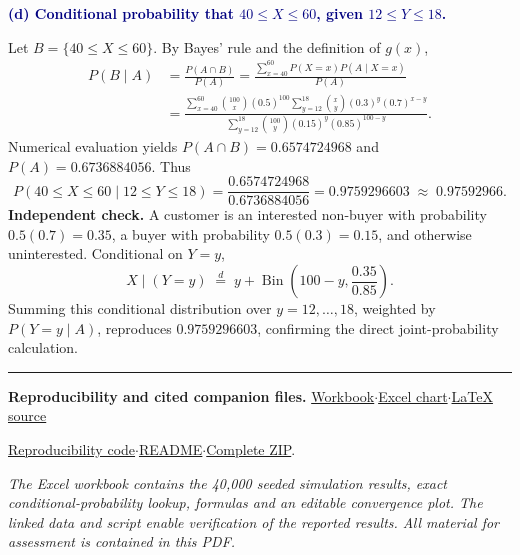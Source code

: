 \documentclass[10pt,a4paper]{article}
\newcommand{\parthead}[1]{\vspace{2pt}\noindent\textcolor{navy}{\bfseries #1}\par\vspace{-2pt}}
\begin{document}
\parthead{(d) Conditional probability that \(40\le X\le60\), given \(12\le Y\le18\).}
Let \(B=\{40\le X\le60\}\). By Bayes' rule and the definition of \(g(x)\),
\begin{align*}
 P(B\mid A)
 &=\frac{P(A\cap B)}{P(A)}
 =\frac{\displaystyle\sum_{x=40}^{60}P(X=x)P(A\mid X=x)}{P(A)}\\
 &=\frac{\displaystyle\sum_{x=40}^{60}{100\choose x}(0.5)^{100}
 \sum_{y=12}^{18}{x\choose y}(0.3)^y(0.7)^{x-y}}
 {\displaystyle\sum_{y=12}^{18}{100\choose y}(0.15)^y(0.85)^{100-y}}.
\end{align*}
Numerical evaluation yields \(P(A\cap B)=0.6574724968\) and \(P(A)=0.6736884056\). Thus
\begin{equation}
 \boxed{\;P(40\le X\le60\mid12\le Y\le18)
 =\frac{0.6574724968}{0.6736884056}
 =0.9759296603\;\approx\;\mathbf{0.97592966}.\;}
\end{equation}
\textbf{Independent check.} A customer is an interested non-buyer with probability \(0.5(0.7)=0.35\), a buyer with probability \(0.5(0.3)=0.15\), and otherwise uninterested. Conditional on \(Y=y\),
\[
 X\mid(Y=y)\;\overset{d}{=}\;y+\operatorname{Bin}\!\left(100-y,\frac{0.35}{0.85}\right).
\]
Summing this conditional distribution over \(y=12,\ldots,18\), weighted by \(P(Y=y\mid A)\), reproduces \(0.9759296603\), confirming the direct joint-probability calculation.

\vfill
\noindent\rule{\linewidth}{0.35pt}
{\footnotesize\textbf{Reproducibility and cited companion files.}\enspace
\href{https://github.com/YongWilliam-ai/ISOM3540_ass3_2026/blob/main/ISOM3540_ass4_2026/ISOM3540_21089310_ass4_MonteCarlo.xlsx}{Workbook}\enspace$\cdot$\enspace \href{https://github.com/YongWilliam-ai/ISOM3540_ass3_2026/blob/main/ISOM3540_ass4_2026/ISOM3540_21089310_ass4_Excel_Convergence.png}{Excel chart}\enspace$\cdot$\enspace \href{https://github.com/YongWilliam-ai/ISOM3540_ass3_2026/blob/main/ISOM3540_ass4_2026/ISOM3540_21089310_ass4.tex}{LaTeX source}\par\noindent \href{https://github.com/YongWilliam-ai/ISOM3540_ass3_2026/blob/main/ISOM3540_ass4_2026/reproduce_mc_ass4.py}{Reproducibility code}\enspace$\cdot$\enspace \href{https://github.com/YongWilliam-ai/ISOM3540_ass3_2026/blob/main/ISOM3540_ass4_2026/README.md}{README}\enspace$\cdot$\enspace \href{https://github.com/YongWilliam-ai/ISOM3540_ass3_2026/blob/main/ISOM3540_ass4_2026/ISOM3540_21089310_ass4_Complete_Package.zip}{Complete ZIP}.\par
\textit{The Excel workbook contains the 40,000 seeded simulation results, exact conditional-probability lookup, formulas and an editable convergence plot. The linked data and script enable verification of the reported results. All material for assessment is contained in this PDF.}}
\end{document}
